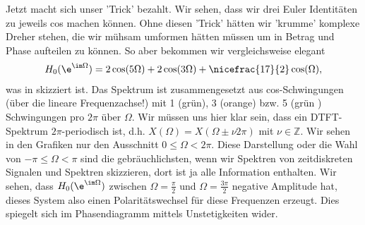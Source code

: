 %
Jetzt macht sich unser 'Trick' bezahlt. Wir sehen, dass wir drei Euler Identitäten
zu jeweils cos machen können. Ohne diesen 'Trick' hätten wir 'krumme' komplexe Dreher
stehen, die wir mühsam umformen hätten müssen um in Betrag und Phase aufteilen zu können.
So aber bekommen wir vergleichsweise elegant
\begin{align}
\label{eq:64BE42BAEF_H0}
H_0(\e^{\im\Omega}) = 2 \cos(5\Omega) + 2 \cos(3\Omega) + \nicefrac{17}{2} \cos(\Omega),
\end{align}
was in  skizziert ist.
%
Das Spektrum ist zusammengesetzt aus cos-Schwingungen (über die lineare Frequenzachse!)
mit 1 (grün), 3 (orange)
bzw. 5 (grün ) Schwingungen pro $2\pi$ über $\Omega$.
%
Wir müssen uns hier klar sein, dass ein DTFT-Spektrum $2\pi$-periodisch ist, d.h.
$X(\Omega) = X(\Omega \pm \nu 2\pi)$ mit $\nu\in\mathbb{Z}$. Wir sehen in den
Grafiken nur den
Ausschnitt $0\leq \Omega < 2\pi$. Diese Darstellung oder die Wahl von
$-\pi\leq \Omega < \pi$ sind die gebräuchlichsten, wenn wir
Spektren von zeitdiskreten Signalen und Spektren skizzieren, dort ist ja
alle Information enthalten.
%
Wir sehen, dass $H_0(\e^{\im \Omega})$ zwischen $\Omega=\frac{\pi}{2}$ und $\Omega=\frac{3\pi}{2}$
negative Amplitude hat, dieses System also einen Polaritätswechsel für diese
Frequenzen erzeugt.
Dies spiegelt sich im Phasendiagramm mittels Unstetigkeiten wider.

